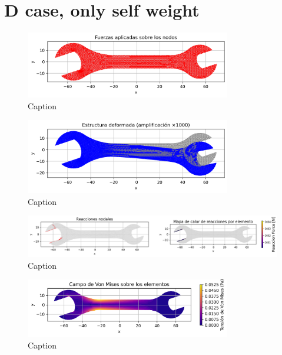 \documentclass{article}  %
\begin{document}
\section{D case, only self weight}

\begin{figure}[H]
  \centering
  \includegraphics[width=0.8\textwidth]{GRAFICOS/Case d_fuerzas.png}
  \caption{Caption}
  \label{fig:strain}
\end{figure}

\begin{figure}[H]
  \centering
  \includegraphics[width=0.8\textwidth]{GRAFICOS/Case d_deformada.png}
  \caption{Caption}
  \label{fig:stress}
\end{figure}

\begin{figure}[H]
  \centering
  \includegraphics[width=1\textwidth]{GRAFICOS/Case d_deformada_reacciones.png}
  \caption{Caption}
  \label{fig:principal}
\end{figure}

\begin{figure}[H]
  \centering
  \includegraphics[width=0.8\textwidth]{GRAFICOS/Case d_von_mises.png}
  \caption{Caption}
  \label{fig:principal}
\end{figure}
\end{document}
